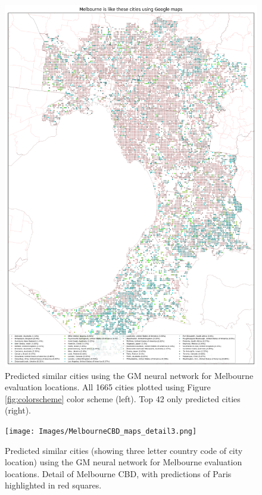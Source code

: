 \documentclass[sageh,times]{sagej}
\begin{document}
\begin{figure}[!htbp]
\includegraphics[scale=0.20]{Images/MelbourneOverallAbrev_maps.png} 
\caption{Predicted similar cities using the GM neural network for Melbourne evaluation locations. All 1665 cities plotted using Figure \ref{fig:colorscheme} color scheme (left). Top 42 only predicted cities (right).}    
 \label{fig:melmaps}  
\end{figure} 

\begin{figure}[!htbp]
\centering     
\texttt{[image: Images/MelbourneCBD\_maps\_detail3.png]} 
\caption{Predicted similar cities (showing three letter country code of city location) using the GM neural network for Melbourne evaluation locations. Detail of Melbourne CBD, with predictions of Paris highlighted in red squares.}    
 \label{fig:melmapscbd}  
\end{figure} 
\end{document}

